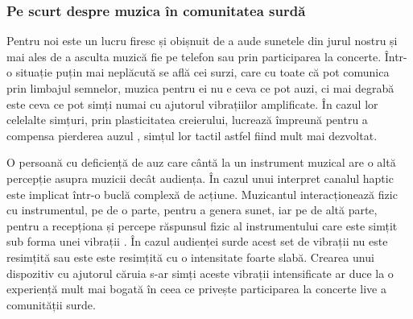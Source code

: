 \documentclass[../IoMusT.tex]{subfiles}
\begin{document}
\subsubsection{Pe scurt despre muzica în comunitatea surdă}
Pentru noi este un lucru firesc și obișnuit de a aude sunetele din jurul nostru și mai ales de a asculta muzică fie pe telefon sau prin participarea la concerte. Într-o situație puțin mai neplăcută se află cei surzi, care cu toate că pot comunica prin limbajul semnelor, muzica pentru ei nu e ceva ce pot auzi, ci mai degrabă este ceva ce pot simți numai cu ajutorul vibrațiilor amplificate. În cazul lor celelalte simțuri, prin plasticitatea creierului, lucrează împreună pentru a compensa pierderea auzul \cite{DEAF}, simțul lor tactil astfel fiind mult mai dezvoltat. 
\\
\par O persoană cu deficiență de auz care cântă la un instrument muzical are o altă percepție asupra muzicii decât audiența. În cazul unui interpret canalul haptic este implicat într-o buclă complexă de acțiune. Muzicantul interacționează fizic cu instrumentul, pe de o parte, pentru a genera sunet, iar pe de altă parte, pentru a recepționa și percepe răspunsul fizic al instrumentului care este simțit sub forma unei vibrații \cite{Haptic}. În cazul audienței surde acest set de vibrații nu este resimțită sau este este resimțită cu o intensitate foarte slabă. Crearea unui dispozitiv cu ajutorul căruia s-ar simți aceste vibrații intensificate ar duce la o experiență mult mai bogată în ceea ce privește participarea la concerte live a comunității surde.
\end{document}
